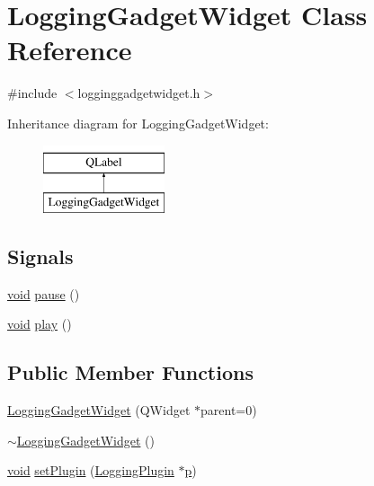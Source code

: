 \hypertarget{class_logging_gadget_widget}{\section{Logging\-Gadget\-Widget Class Reference}
\label{class_logging_gadget_widget}
}


{\ttfamily \#include $<$logginggadgetwidget.\-h$>$}

Inheritance diagram for Logging\-Gadget\-Widget\-:\begin{figure}[H]
\begin{center}
\leavevmode
\includegraphics[height=2.000000cm]{class_logging_gadget_widget}
\end{center}
\end{figure}
\subsection*{Signals}
\begin{DoxyCompactItemize}
\item 
\hyperlink{group___u_a_v_objects_plugin_ga444cf2ff3f0ecbe028adce838d373f5c}{void} \hyperlink{group___g_c_s_control_gadget_plugin_gab36252efc1545bad1c46720b2fd92a22}{pause} ()
\item 
\hyperlink{group___u_a_v_objects_plugin_ga444cf2ff3f0ecbe028adce838d373f5c}{void} \hyperlink{group___g_c_s_control_gadget_plugin_gabd0c6db2a3fecf6afb525d40bc12431c}{play} ()
\end{DoxyCompactItemize}
\subsection*{Public Member Functions}
\begin{DoxyCompactItemize}
\item 
\hyperlink{group___g_c_s_control_gadget_plugin_ga82895cf265acb40f6491abf90e3b018e}{Logging\-Gadget\-Widget} (Q\-Widget $\ast$parent=0)
\item 
\hyperlink{group___g_c_s_control_gadget_plugin_gafa54fcc426f5064c9706b1528834d6a0}{$\sim$\-Logging\-Gadget\-Widget} ()
\item 
\hyperlink{group___u_a_v_objects_plugin_ga444cf2ff3f0ecbe028adce838d373f5c}{void} \hyperlink{group___g_c_s_control_gadget_plugin_ga9ff08b035e0189200c2f5d2e2b234dac}{set\-Plugin} (\hyperlink{class_logging_plugin}{Logging\-Plugin} $\ast$\hyperlink{glext_8h_aa5367c14d90f462230c2611b81b41d23}{p})
\end{DoxyCompactItemize}
